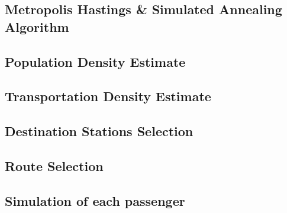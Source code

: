 \documentclass{mcmthesis}
\begin{document}
\begin{appendices}
\subsection{Metropolis Hastings \& Simulated Annealing Algorithm}


\subsection{Population Density Estimate}


\subsection{Transportation Density Estimate}


\subsection{Destination Stations Selection}


\subsection{Route Selection}


\subsection{Simulation of each passenger}

\end{appendices}
\end{document}
